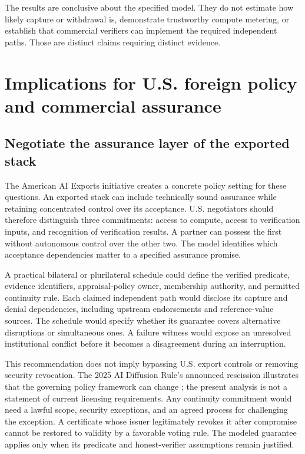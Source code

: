 \documentclass[11pt,letterpaper]{article}
\begin{document}
The results are conclusive about the specified model. They do not estimate how likely capture or withdrawal is, demonstrate trustworthy compute metering, or establish that commercial verifiers can implement the required independent paths. Those are distinct claims requiring distinct evidence.

\section{Implications for U.S. foreign policy and commercial assurance}
\subsection{Negotiate the assurance layer of the exported stack}
The American AI Exports initiative creates a concrete policy setting for these questions. An exported stack can include technically sound assurance while retaining concentrated control over its acceptance. U.S. negotiators should therefore distinguish three commitments: access to compute, access to verification inputs, and recognition of verification results. A partner can possess the first without autonomous control over the other two. The model identifies which acceptance dependencies matter to a specified assurance promise.

A practical bilateral or plurilateral schedule could define the verified predicate, evidence identifiers, appraisal-policy owner, membership authority, and permitted continuity rule. Each claimed independent path would disclose its capture and denial dependencies, including upstream endorsements and reference-value sources. The schedule would specify whether its guarantee covers alternative disruptions or simultaneous ones. A failure witness would expose an unresolved institutional conflict before it becomes a disagreement during an interruption.

This recommendation does not imply bypassing U.S. export controls or removing security revocation. The 2025 AI Diffusion Rule's announced rescission illustrates that the governing policy framework can change \citep{bis}; the present analysis is not a statement of current licensing requirements. Any continuity commitment would need a lawful scope, security exceptions, and an agreed process for challenging the exception. A certificate whose issuer legitimately revokes it after compromise cannot be restored to validity by a favorable voting rule. The modeled guarantee applies only when its predicate and honest-verifier assumptions remain justified.
\end{document}
